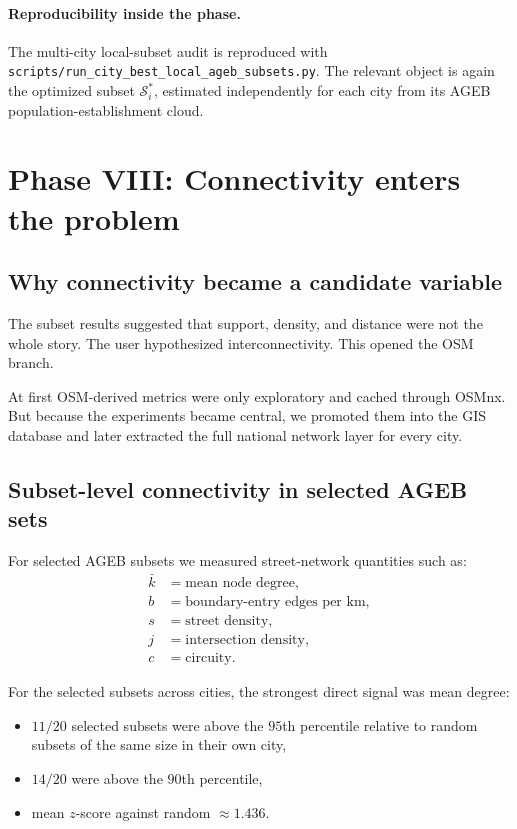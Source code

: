 \documentclass[11pt]{article}
\begin{document}
\paragraph{Reproducibility inside the phase.}
The multi-city local-subset audit is reproduced with
\texttt{scripts/run\_city\_best\_local\_ageb\_subsets.py}.
The relevant object is again the optimized subset \(\mathcal{S}_i^\ast\), estimated independently for each city from its AGEB population-establishment cloud.

\section{Phase VIII: Connectivity enters the problem}

\subsection{Why connectivity became a candidate variable}

The subset results suggested that support, density, and distance were not the whole story. The user hypothesized interconnectivity. This opened the OSM branch.

At first OSM-derived metrics were only exploratory and cached through OSMnx. But because the experiments became central, we promoted them into the GIS database and later extracted the full national network layer for every city.

\subsection{Subset-level connectivity in selected AGEB sets}

For selected AGEB subsets we measured street-network quantities such as:
\begin{align}
\bar{k} &= \text{mean node degree},\\
b &= \text{boundary-entry edges per km},\\
s &= \text{street density},\\
j &= \text{intersection density},\\
c &= \text{circuity}.
\end{align}

For the selected subsets across cities, the strongest direct signal was mean degree:
\begin{itemize}
\item \(11/20\) selected subsets were above the \(95\)th percentile relative to random subsets of the same size in their own city,
\item \(14/20\) were above the \(90\)th percentile,
\item mean \(z\)-score against random \(\approx 1.436\).
\end{itemize}
\end{document}
